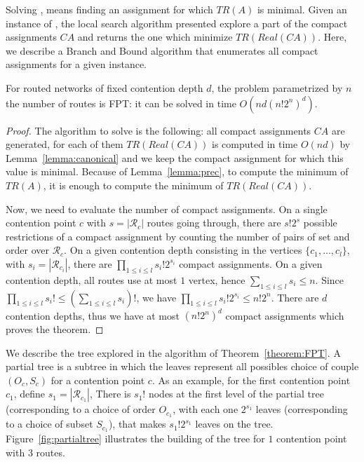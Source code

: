 
Solving \spall, means finding an assignment for which $TR(A)$ is minimal. 
Given an instance of \spall, the local search algorithm presented explore a part of the compact assignments $CA$ and returns the one which minimize $TR(Real(CA))$. Here, we describe a Branch and Bound algorithm that enumerates all compact assignments for a given instance.

\begin{theorem}\label{theorem:FPT}
For routed networks of fixed contention depth $d$, the problem \spall parametrized by $n$ the number of routes is FPT: it can be solved in time $O(nd(n!2^{n})^{d})$.
\end{theorem}
\begin{proof}
The algorithm to solve \spall is the following: all compact assignments $CA$ are generated, for each of them $TR(Real(CA))$ is computed in time
$O(nd)$ by Lemma~\ref{lemma:canonical} and we keep the compact assignment for which this value is minimal.  Because of Lemma~\ref{lemma:prec}, to compute the minimum of $TR(A)$, it is enough 
to compute the minimum of $TR(Real(CA))$.

 Now, we need to evaluate the number of compact assignments. 
On a single contention point $c$ with $s = |\mathcal{R}_c|$ routes going through, there are $s!2^s$ possible restrictions of a compact assignment by counting the number of pairs of set and order over $\mathcal{R}_c$.
On a given contention depth consisting in the vertices $\{c_1,\dots,c_l\}$, with $s_i = |\mathcal{R}_{c_{i}}|$, there are 
$\prod_{1 \leq i\leq l} s_i!2^{s_i}$ compact assignments. On a given contention depth, all routes use at most $1$ vertex, hence $\sum_{1 \leq i\leq l} s_i \leq n$. Since $\prod_{1 \leq i\leq l} s_i! \leq (\sum_{1 \leq i\leq l} s_i)!$, we have $\prod_{1 \leq i\leq l} s_i!2^{s_i} \leq n!2^n$. There are $d$ contention depths, thus we have at most $ (n!2^{n})^{d}$ compact assignments which proves the theorem.
\end{proof}

We describe the tree explored in the algorithm of Theorem~\ref{theorem:FPT}. A partial tree is a subtree in which the leaves represent all possibles choice of couple $(O_{c},S_c)$ for a contention point $c$. As an example, for the first contention point $c_1$, define $s_1 = |\mathcal{R}_{c_1}|$, There is $s_1!$ nodes at the first level of the partial tree (corresponding to a choice of order $O_{c_1}$, with each one $2^{s_1}$ leaves (corresponding to a choice of subset $S_{c_1}$), that makes $s_1!2^{s_1}$ leaves on the tree. Figure~\ref{fig:partialtree} illustrates the building of the tree for $1$ contention point with $3$ routes.

